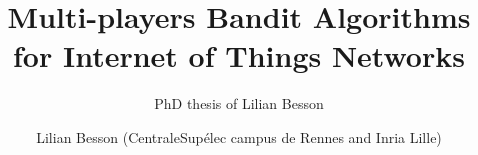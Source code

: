 \documentclass[a4paper,12pt,twoside,index,PageStyleII,print]{0-Misc/PhDThesisPSnPDF}
\title{Multi-players Bandit Algorithms for Internet of Things Networks}
\subtitle{PhD thesis of Lilian Besson}
\author{Lilian Besson (CentraleSupélec campus de Rennes and Inria Lille)}
\begin{document}
	\frontmatter
	

	\begin{spacing}{1}
		\dominitoc
		\tableofcontents
	\end{spacing}

	\mainmatter

	

	

	\newpage

	\begin{small}   %

	\begin{spacing}{0.93}
		
		\printnomenclature[8em]
		\label{chapter:nomenclature}
	\end{spacing}

	\begin{spacing}{1.00}
		\listoffigures
		\listofalgorithms
		\listoflistings
		\listoftables
	\end{spacing}

	\begin{spacing}{0.93}
		
		\cleardoublepage
		
	\end{spacing}

	\end{small}   %


	\backmatter
	\cleardoublepage

\end{document}
